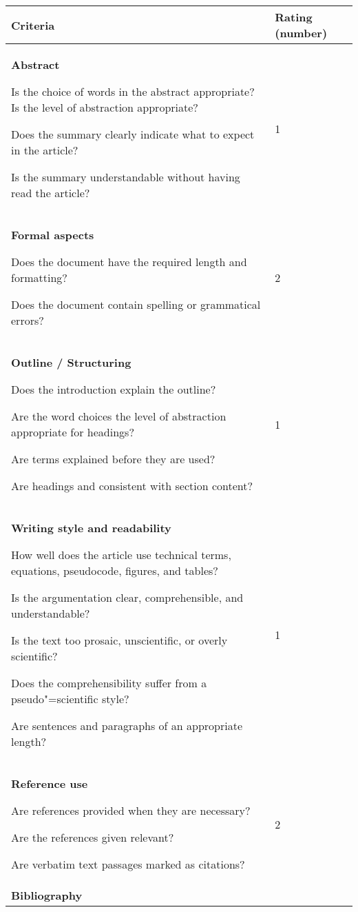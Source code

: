 \documentclass[12pt]{scrartcl}
\begin{document}
\begin{longtable}{|p{12cm}|p{2.5cm}|}	
		\hline
			\textbf{Criteria} & \textbf{Rating (number)} \\
		\hline
		\hline
		\endhead
			\textbf{Abstract}		
						
				Is the choice of words in the abstract appropriate? Is the level of abstraction appropriate?
				
                Does the summary clearly indicate what to expect in the article? 
				
                Is the summary understandable without having read the article?			
			& 1 \ \\
		\hline
			\textbf{Formal aspects}	
				
				Does the document have the required length and formatting?
				
				Does the document contain spelling or grammatical errors?
			& 2 \ \\
		\hline	
			\textbf{Outline / Structuring}		
			
				Does the introduction explain the outline?
				
				Are the word choices the level of abstraction appropriate for headings?
				
				Are terms explained before they are used?
				
				Are headings and consistent with section content?
			& 1 \ \\
		\hline	
			\textbf{Writing style and readability}	
			
				How well does the article use technical terms, equations, pseudocode, figures, and tables?

				Is the argumentation clear, comprehensible, and understandable?

				Is the text too prosaic, unscientific, or overly scientific?
				
				Does the comprehensibility suffer from a pseudo"=scientific style?

				Are sentences and paragraphs of an appropriate length?
			& 1 \ \\			
		\hline	
			\textbf{Reference use}
			
				Are references provided when they are necessary?
				
				Are the references given relevant?
				
				Are verbatim text passages marked as citations?
			& 2 \ \\				
		\hline		
			\textbf{Bibliography}
			

\end{longtable}
\end{document}
